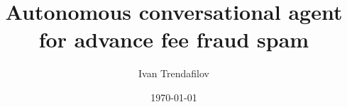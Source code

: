 \documentclass[abbrevs,bsc,logo,frontabs]{styles/infthesis}
\title{Autonomous conversational agent for advance fee fraud spam}
\author{Ivan Trendafilov}
\date{\today}
\begin{document}
  \begin{preliminary}
    \maketitle
  
    
    \standarddeclaration
    \tableofcontents
  \end{preliminary}

  
  
  
  
  
  
  
  
  


  \appendix
  
  
  
\end{document}
